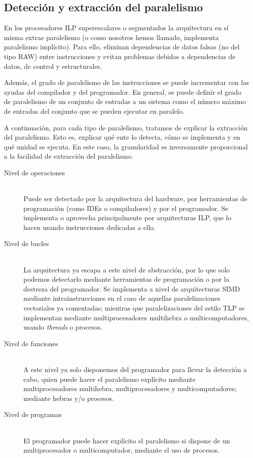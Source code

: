 \subsection{Detección y extracción del paralelismo}
En los procesadores ILP superescalares o segmentados la arquitectura en sí misma extrae paralelismo (o como nosotros hemos llamado, implementa paralelismo implícito). Para ello, eliminan dependencias de datos falsas (no del tipo RAW) entre instrucciones y evitan problemas debidos a dependencias de datos, de control y estructurales.

Además, el grado de paralelismo de las instrucciones se puede incrementar con las ayudas del compilador y del programador. En general, se puede definir el grado de paralelismo de un conjunto de entradas a un sistema como el número máximo de entradas del conjunto que se pueden ejecutar en paralelo. 

A continuación, para cada tipo de paralelismo, tratamos de explicar la extracción del paralelismo. Esto es, explicar qué ente lo detecta, cómo se implementa y en qué unidad se ejecuta. En este caso, la granularidad es inversamente proporcional a la facilidad de extracción del paralelismo.
\begin{description}
    \item [Nivel de operaciones]~\\
        Puede ser detectado por la arquitectura del hardware, por herramientas de programación (como IDEs o compiladores) y por el programador. Se implementa o aprovecha principalmente por arquitecturas ILP, que lo hacen usando instrucciones dedicadas a ello.
    \item [Nivel de bucles]~\\
        La arquitectura ya escapa a este nivel de abstracción, por lo que solo podemos detectarlo mediante herramientas de programación o por la destreza del programador. Se implementa a nivel de arquitecturas SIMD mediante intrainstrucciones en el caso de aquellas paralelizaciones vectoriales ya comentadas; mientras que paralelizaciones del estilo TLP se implementan mediante multiprocesadores multihebra o multicomputadores, usando \emph{threads} o procesos.
    \item [Nivel de funciones]~\\
        A este nivel ya solo disponemos del programador para llevar la detección a cabo, quien puede hacer el paralelismo explícito mediante multiprocesadores multihebra, multiprocesadores y multicomputadores; mediante hebras y/o procesos.
    \item [Nivel de programas]~\\
        El programador puede hacer explícito el paralelismo si dispone de un multiprocesador o multicomputador, mediante el uso de procesos.
\end{description}

